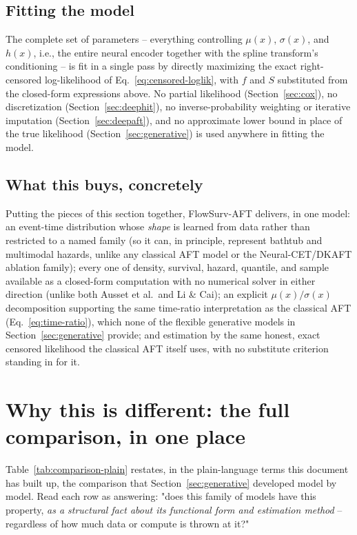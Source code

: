 \documentclass[11pt]{article}
\begin{document}
\subsection{Fitting the model}
The complete set of parameters -- everything controlling $\mu(x)$,
$\sigma(x)$, and $h(x)$, i.e., the entire neural encoder together with
the spline transform's conditioning -- is fit in a single pass by
directly maximizing the exact right-censored log-likelihood of
Eq.~\eqref{eq:censored-loglik}, with $f$ and $S$ substituted from the
closed-form expressions above. No partial likelihood
(Section~\ref{sec:cox}), no discretization
(Section~\ref{sec:deephit}), no inverse-probability weighting or
iterative imputation (Section~\ref{sec:deepaft}), and no approximate
lower bound in place of the true likelihood
(Section~\ref{sec:generative}) is used anywhere in fitting the model.

\subsection{What this buys, concretely}
Putting the pieces of this section together, FlowSurv-AFT delivers, in
one model: an event-time distribution whose \emph{shape} is learned from
data rather than restricted to a named family (so it can, in principle,
represent bathtub and multimodal hazards, unlike any classical AFT model
or the Neural-CET/DKAFT ablation family); every one of density, survival,
hazard, quantile, and sample available as a closed-form computation with
no numerical solver in either direction (unlike both Ausset et al.\ and
Li \& Cai); an explicit $\mu(x)/\sigma(x)$ decomposition supporting the
same time-ratio interpretation as the classical AFT
(Eq.~\eqref{eq:time-ratio}), which none of the flexible generative models
in Section~\ref{sec:generative} provide; and estimation by the same
honest, exact censored likelihood the classical AFT itself uses, with no
substitute criterion standing in for it.

\section{Why this is different: the full comparison, in one place}
\label{sec:comparison}

Table~\ref{tab:comparison-plain} restates, in the plain-language terms
this document has built up, the comparison that
Section~\ref{sec:generative} developed model by model. Read each row as
answering: "does this family of models have this property, \emph{as a
structural fact about its functional form and estimation method} --
regardless of how much data or compute is thrown at it?"
\end{document}
